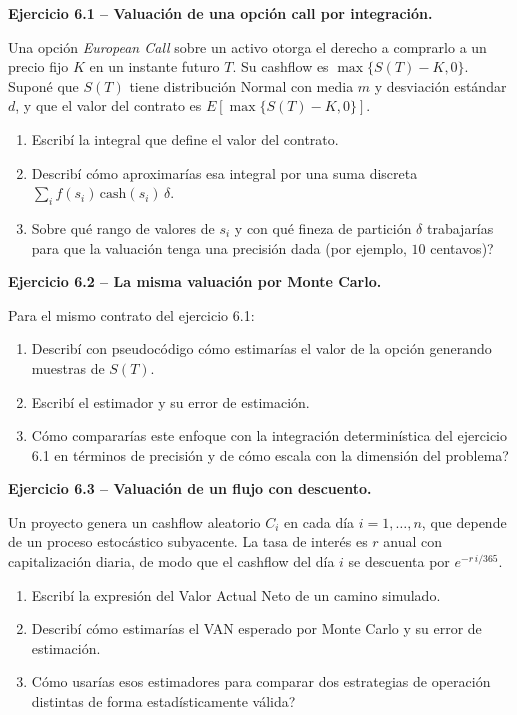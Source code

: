 \documentclass[11pt,a4paper]{article}
\newcommand{\ejercicio}[1]{\par\medskip\noindent\textbf{#1}\par\nopagebreak\smallskip}
\begin{document}
\ejercicio{Ejercicio 6.1 -- Valuaci\'on de una opci\'on call por integraci\'on.}
Una opci\'on \emph{European Call} sobre un activo otorga el derecho a comprarlo a un
precio fijo $K$ en un instante futuro $T$. Su cashflow es $\max\{S(T)-K,0\}$.
Supon\'e que $S(T)$ tiene distribuci\'on Normal con media $m$ y desviaci\'on est\'andar
$d$, y que el valor del contrato es $E[\max\{S(T)-K,0\}]$.
\begin{enumerate}[label=(\alph*)]
  \item Escrib\'i la integral que define el valor del contrato.
  \item Describ\'i c\'omo aproximar\'ias esa integral por una suma discreta
        $\sum_i f(s_i)\,\mathrm{cash}(s_i)\,\delta$.
  \item \textquestiondown{}Sobre qu\'e rango de valores de $s_i$ y con qu\'e fineza de partici\'on
        $\delta$ trabajar\'ias para que la valuaci\'on tenga una precisi\'on dada (por
        ejemplo, $10$ centavos)?
\end{enumerate}

\ejercicio{Ejercicio 6.2 -- La misma valuaci\'on por Monte Carlo.}
Para el mismo contrato del ejercicio 6.1:
\begin{enumerate}[label=(\alph*)]
  \item Describ\'i con pseudoc\'odigo c\'omo estimar\'ias el valor de la opci\'on generando
        muestras de $S(T)$.
  \item Escrib\'i el estimador y su error de estimaci\'on.
  \item \textquestiondown{}C\'omo comparar\'ias este enfoque con la integraci\'on determin\'istica del
        ejercicio 6.1 en t\'erminos de precisi\'on y de c\'omo escala con la dimensi\'on
        del problema?
\end{enumerate}

\ejercicio{Ejercicio 6.3 -- Valuaci\'on de un flujo con descuento.}
Un proyecto genera un cashflow aleatorio $C_i$ en cada d\'ia $i=1,\dots,n$, que
depende de un proceso estoc\'astico subyacente. La tasa de inter\'es es $r$ anual
con capitalizaci\'on diaria, de modo que el cashflow del d\'ia $i$ se descuenta por
$e^{-r\,i/365}$.
\begin{enumerate}[label=(\alph*)]
  \item Escrib\'i la expresi\'on del Valor Actual Neto de un camino simulado.
  \item Describ\'i c\'omo estimar\'ias el VAN esperado por Monte Carlo y su error de
        estimaci\'on.
  \item \textquestiondown{}C\'omo usar\'ias esos estimadores para comparar dos estrategias de
        operaci\'on distintas de forma estad\'isticamente v\'alida?
\end{enumerate}
\end{document}
